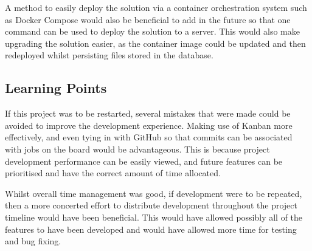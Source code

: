 A method to easily deploy the solution via a container orchestration system such as Docker Compose would also be beneficial to add in the future so that one command can be used to deploy the solution to a server. This would also make upgrading the solution easier, as the container image could be updated and then redeployed whilst persisting files stored in the database.

\subsection{Learning Points}
\label{sec:learning-points}
If this project was to be restarted, several
mistakes that were made could be avoided to improve the development experience.
Making use of Kanban more effectively, and even tying in with GitHub so that
commits can be associated with jobs on the board would be advantageous. This is
because project development performance can be easily viewed, and future
features can be prioritised and have the correct amount of time allocated.

Whilst overall time management was good, if development were to be repeated, then a more concerted effort to distribute development throughout the project timeline would have been beneficial. This would have allowed possibly all of the features to have been developed and would have allowed more time for testing and bug fixing.